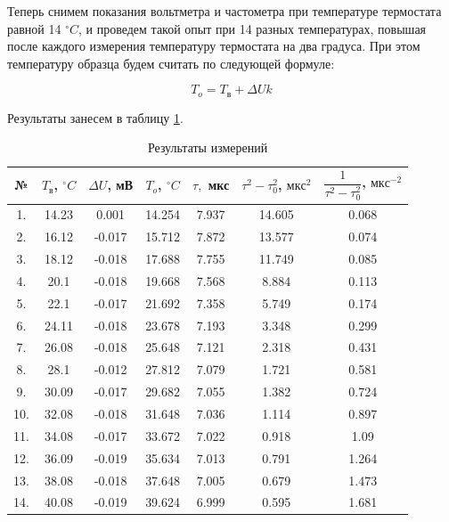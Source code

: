 \documentclass[12pt]{kiarticle}
\begin{document}
Теперь снимем показания вольтметра и частометра при температуре термостата равной 14 $ ^\circ C $, и проведем такой опыт при 14 разных температурах, повышая после каждого измерения температуру термостата на два градуса. При этом температуру образца будем считать по следующей формуле:

\begin{equation}\label{}
T_o = T_в + \varDelta Uk
\end{equation}

Результаты занесем в таблицу \ref{res}.

\begin{table}[htbp]
	\centering
	\caption{Результаты измерений}

\begin{tabular}{|c|c|c|c|c|c|c|} 
	\hline 
	№ &  $ T_в $, $ ^\circ C $ &  $ \varDelta  U $, мВ & $ T_o $, $ ^\circ C$ & $ \tau, $ мкс & $ \tau^2 - \tau_0^2 $, $ мкс^2 $ & $ \dfrac{1}{\tau^2 - \tau_0^2} $, $ мкс^{-2} $  \\ 	\hline
	
 1. & 14.23 & 0.001 & 14.254 & 7.937 & 14.605 & 0.068 \\
2. & 16.12 & -0.017 & 15.712 & 7.872 & 13.577 & 0.074 \\
3. & 18.12 & -0.018 & 17.688 & 7.755 & 11.749 & 0.085 \\
4. & 20.1 & -0.018 & 19.668 & 7.568 & 8.884 & 0.113 \\
5. & 22.1 & -0.017 & 21.692 & 7.358 & 5.749 & 0.174 \\
6. & 24.11 & -0.018 & 23.678 & 7.193 & 3.348 & 0.299 \\
7. & 26.08 & -0.018 & 25.648 & 7.121 & 2.318 & 0.431 \\
8. & 28.1 & -0.012 & 27.812 & 7.079 & 1.721 & 0.581 \\
9. & 30.09 & -0.017 & 29.682 & 7.055 & 1.382 & 0.724 \\
10. & 32.08 & -0.018 & 31.648 & 7.036 & 1.114 & 0.897 \\
11. & 34.08 & -0.017 & 33.672 & 7.022 & 0.918 & 1.09 \\
12. & 36.09 & -0.019 & 35.634 & 7.013 & 0.791 & 1.264 \\
13. & 38.08 & -0.018 & 37.648 & 7.005 & 0.679 & 1.473 \\
14. & 40.08 & -0.019 & 39.624 & 6.999 & 0.595 & 1.681 \\
	\hline

\end{tabular}%
\label{res}%
\end{table}%
\end{document}
